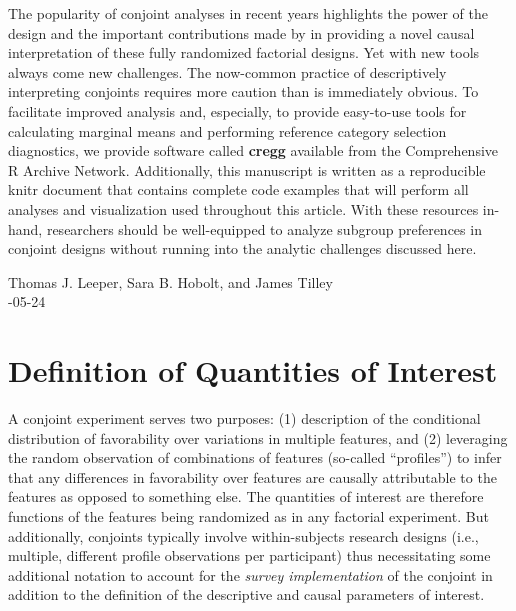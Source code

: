 \documentclass[a4paper,12pt]{article}\usepackage[]{graphicx}\usepackage[]{color}
\begin{document}
The popularity of conjoint analyses in recent years highlights the power of the design and the important contributions made by \citet{HainmuellerHopkinsYamamoto2014} in providing a novel causal interpretation of these fully randomized factorial designs. Yet with new tools always come new challenges. The now-common practice of descriptively interpreting conjoints requires more caution than is immediately obvious. To facilitate improved analysis and, especially, to provide easy-to-use tools for calculating marginal means and performing reference category selection diagnostics, we provide software called \textbf{cregg} \citep{Leeper2018cregg} available from the Comprehensive R Archive Network. Additionally, this manuscript is written as a reproducible knitr document \citep{Xie2015} that contains complete code examples that will perform all analyses and visualization used throughout this article. With these resources in-hand, researchers should be well-equipped to analyze subgroup preferences in conjoint designs without running into the analytic challenges discussed here.




\singlespacing


\clearpage


\appendix
\setcounter{page}{1}


\vspace{0.5em}

\noindent Thomas J. Leeper, Sara B. Hobolt, and James Tilley\\
-05-24

\renewcommand{\contentsname}{}
\vspace{-2em}
\tableofcontents



\clearpage

\section{Definition of Quantities of Interest}\label{app:quantities}

A conjoint experiment serves two purposes: (1) description of the conditional distribution of favorability over variations in multiple features, and (2) leveraging the random observation of combinations of features (so-called ``profiles'') to infer that any differences in favorability over features are causally attributable to the features as opposed to something else. The quantities of interest are therefore functions of the features being randomized as in any factorial experiment. But additionally, conjoints typically involve within-subjects research designs (i.e., multiple, different profile observations per participant) thus necessitating some additional notation to account for the \textit{survey implementation} of the conjoint in addition to the definition of the descriptive and causal parameters of interest.
\end{document}
